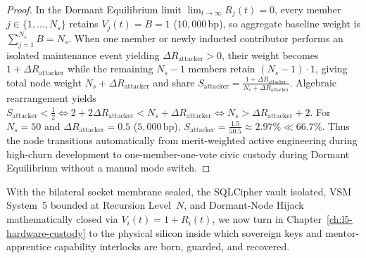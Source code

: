 \begin{proof}
In the Dormant Equilibrium limit $\lim_{t\to\infty} R_j(t) = 0$, every member $j \in \{1,\dots,N_s\}$
retains $V_j(t) = B = 1$ ($10{,}000\,\mathrm{bp}$), so aggregate baseline weight is $\sum_{j=1}^{N_s} B = N_s$.
When one member or newly inducted contributor performs an isolated maintenance event yielding
$\Delta R_{\mathrm{attacker}} > 0$, their weight becomes $1 + \Delta R_{\mathrm{attacker}}$ while
the remaining $N_s - 1$ members retain $(N_s - 1)\cdot 1$, giving total node weight
$N_s + \Delta R_{\mathrm{attacker}}$ and share $S_{\mathrm{attacker}} =
\frac{1 + \Delta R_{\mathrm{attacker}}}{N_s + \Delta R_{\mathrm{attacker}}}$. Algebraic
rearrangement yields $S_{\mathrm{attacker}} < \frac{1}{2} \iff 2 + 2\Delta R_{\mathrm{attacker}} <
N_s + \Delta R_{\mathrm{attacker}} \iff N_s > \Delta R_{\mathrm{attacker}} + 2$. For $N_s = 50$
and $\Delta R_{\mathrm{attacker}} = 0.5$ ($5{,}000\,\mathrm{bp}$), $S_{\mathrm{attacker}} =
\frac{1.5}{50.5} \approx 2.97\% \ll 66.7\%$. Thus the node transitions automatically from
merit-weighted active engineering during high-churn development to one-member-one-vote civic
custody during Dormant Equilibrium without a manual mode switch.
\end{proof}

With the bilateral socket membrane sealed, the SQLCipher vault isolated, VSM System~5 bounded at
Recursion Level~$N$, and Dormant-Node Hijack mathematically closed via $V_i(t) = 1 + R_i(t)$, we
now turn in Chapter~\ref{ch:l5-hardware-custody} to the physical silicon inside which sovereign
keys and mentor-apprentice capability interlocks are born, guarded, and recovered.
